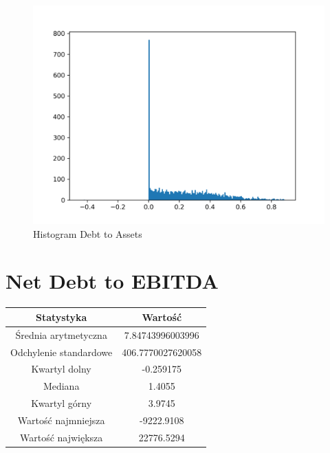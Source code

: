 \documentclass{article}
\begin{document}
\begin{figure}[h!]
    \includegraphics[width=\linewidth]{variables/Debt to Assets.png}
    \caption{Histogram Debt to Assets }
\end{figure}\section{ Net Debt to EBITDA }

\begin{center}
    \begin{tabular}{|c | c|} 
    \hline
    Statystyka & Wartość \\
    \hline\hline
    Średnia arytmetyczna & 7.84743996003996 \\ 
    \hline
    Odchylenie standardowe & 406.7770027620058 \\
    \hline
    Kwartyl dolny & -0.259175 \\
    \hline
    Mediana & 1.4055 \\
    \hline
    Kwartyl górny & 3.9745 \\
    \hline
    Wartość najmniejsza & -9222.9108 \\
    \hline
    Wartość największa & 22776.5294 \\
    \hline
   \end{tabular}
\end{center}
\end{document}
